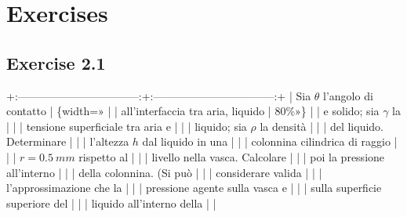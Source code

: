 \documentclass[letterpaper,10pt,italian]{jupyterBook}
\begin{document}
\sphinxAtStartPar
{}

\sphinxstepscope


\section{Exercises}
\label{\detokenize{polimi/fluidmechanics-ita/template/capitoli/02_tensSup/exercises:exercises}}\label{\detokenize{polimi/fluidmechanics-ita/template/capitoli/02_tensSup/exercises:fluid-mechanics-surface-tension-exercises}}\label{\detokenize{polimi/fluidmechanics-ita/template/capitoli/02_tensSup/exercises::doc}}
\sphinxstepscope


\subsection{Exercise 2.1}
\label{\detokenize{polimi/fluidmechanics-ita/template/capitoli/02_tensSup/0301in:exercise-2-1}}\label{\detokenize{polimi/fluidmechanics-ita/template/capitoli/02_tensSup/0301in:fluid-mechanics-surface-tension-ex-01}}\label{\detokenize{polimi/fluidmechanics-ita/template/capitoli/02_tensSup/0301in::doc}}
\sphinxAtStartPar
+:———————————:+:———————————:+
| Sia \(\theta\) l’angolo di contatto | \{width=» |
| all’interfaccia tra aria, liquido | 80\%»\}                             |
| e solido; sia \(\gamma\) la         |                                   |
| tensione superficiale tra aria e  |                                   |
| liquido; sia \(\rho\) la densità    |                                   |
| del liquido. Determinare          |                                   |
| l’altezza \(h\) dal liquido in una  |                                   |
| colonnina cilindrica di raggio    |                                   |
| \(r = 0.5 \ mm\) rispetto al        |                                   |
| livello nella vasca. Calcolare    |                                   |
| poi la pressione all’interno      |                                   |
| della colonnina. (Si può          |                                   |
| considerare valida                |                                   |
| l’approssimazione che la          |                                   |
| pressione agente sulla vasca e    |                                   |
| sulla superficie superiore del    |                                   |
| liquido all’interno della         |                                   |
\end{document}

